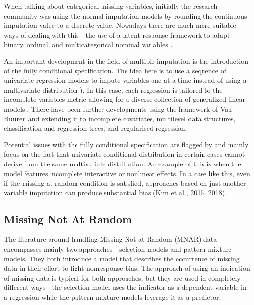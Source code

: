 \documentclass[11pt,a4paper]{article}
\begin{document}
When talking about categorical missing variables, initially the research community was using the normal imputation models by rounding the continuous imputation value to a discrete value. Nowadays there are much more suitable ways of dealing with this - the use of a latent response framework to adapt binary, ordinal, and multicategorical nominal variables \cite{asparouhov2010multiple, quartagno2019multiple}. 

An important development in the field of multiple imputation is the introduction of the fully conditional specification. The idea here is to use a sequence of univariate regression models to impute variables one at a time instead of using a multivariate distribution \cite{van_buuren_multiple_2007,van2018flexible}). In this case, each regression is tailored to the incomplete variables metric allowing for a diverse collection of generalized linear models \cite{enders_missing_2023}. There have been further developments using the framework of Van Buuren and extending it to incomplete covariates, multilevel data structures, classification and regression trees, and regularised regression.

Potential issues with the fully conditional specification are flagged by \cite{bartlett2015multiple, liu2017evaluation} and mainly focus on the fact that univariate conditional distribution in certain cases cannot derive from the same multivariate distribution. An example of this is when the model features incomplete interactive or nonlinear effects. In a case like this, even if the missing at random condition is satisfied, approaches based on just-another-variable imputation can produce substantial bias (Kim et al., 2015, 2018).\cite{kim2015evaluating}



\subsection{Missing Not At Random}

The literature around handling Missing Not at Random (MNAR) data encompasses mainly two approaches - selection models and pattern mixture models. They both introduce a model that describes the occurrence of missing data in their effort to fight nonresponse bias. The approach of using an indication of missing data is typical for both approaches, but they are used in completely different ways - the selection model uses the indicator as a dependent variable in a regression while the pattern mixture models leverage it as a predictor. 
\end{document}

